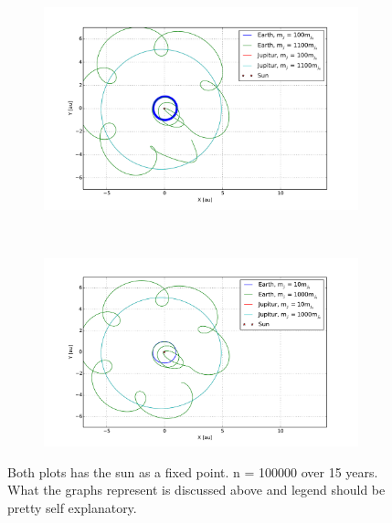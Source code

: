 \begin{figure}[H]
    \centering
    \begin{subfigure}{0.5\textwidth}
        \centering
        \includegraphics[width=\linewidth]{result/bilder/jupitur-mass-three.pdf}
    	\caption{}
    \end{subfigure}%
    ~ 
    \begin{subfigure}{0.5\textwidth}
        \centering
        \includegraphics[width=\linewidth]{result/bilder/jupitur-mass-two.pdf}
        \caption{}
    \end{subfigure}
    \caption{Both plots has the sun as a fixed point. n = 100000 over 15 years. What the graphs represent is discussed above and legend should be pretty self explanatory.}
    \label{fig:three-body-varying}
\end{figure}











